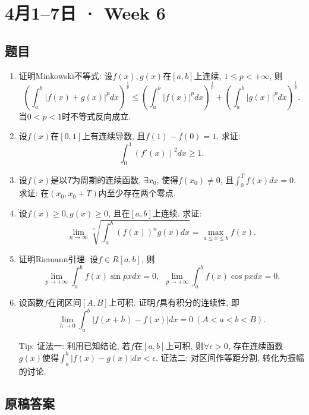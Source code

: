 \documentclass[UTF8,11pt, a4paper, oneside, fontset=none]{ctexbook}
\begin{document}
\clearpage

\section{4月1--7日 · Week 6}

\subsection*{题目}

\begin{enumerate}

\item 证明Minkowski不等式:
设$f(x), g(x)$在$[a, b]$上连续, $1 \leq p < +\infty$, 则
\[
\left( \int_a^b |f(x) + g(x)|^p dx \right)^{\frac{1}{p}} \leq \left( \int_a^b |f(x)|^p dx \right)^{\frac{1}{p}} + \left( \int_a^b |g(x)|^p dx \right)^{\frac{1}{p}}.
\]
当$0 < p < 1$时不等式反向成立.

\item 设$f(x)$在$[0, 1]$上有连续导数, 且$f(1) - f(0) =1$. 求证: 
\[
\int_0^1 (f'(x))^2 dx \geq 1.
\]

\item 设$f(x)$是以$T$为周期的连续函数, $\exists x_0$, 使得$f(x_0) \neq 0$, 且$\int_0^T f(x) dx =0$. 求证: 在$(x_0, x_0 + T)$内至少存在两个零点.

\item 设$f(x) \geq 0, g(x) \geq 0$, 且在$[a, b]$上连续. 求证: 
\[
\lim_{n \to \infty} \sqrt[n]{\int_a^b (f(x))^n g(x) dx } = \max_{a \leq x \leq b} f(x).
\]

\item 证明Riemann引理:
设$f \in R[a, b]$, 则
\[
\lim_{p \to +\infty} \int_a^b f(x) \sin px dx = 0, \ \ \lim_{p \to +\infty} \int_a^b f(x) \cos px dx = 0.
\]

\item 设函数$f$在闭区间$[A, B]$上可积. 证明$f$具有积分的连续性, 即
\[
\lim_{h \to 0} \int_a^b | f(x+h) - f(x) | dx =0 \ (A < a < b < B).
\]

Tip: 证法一: 利用已知结论, 若$f$在$[a, b]$上可积, 则$\forall \epsilon >0$, 存在连续函数$g(x)$使得$\int_a^b |f(x) - g(x)| dx < \epsilon$. 证法二: 对区间作等距分割, 转化为振幅的讨论.

\end{enumerate}

\clearpage

\subsection*{原稿答案}
\end{document}

